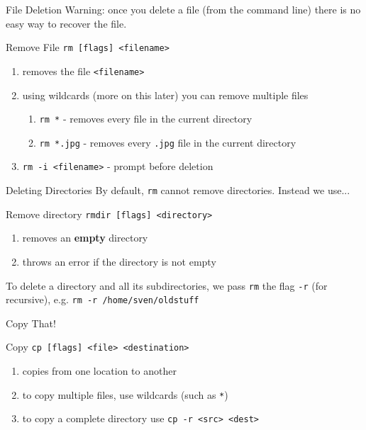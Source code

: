 \documentclass[11pt]{beamer}
\newcommand{\colbf}[1]{\textcolor{mLightBrown!77!black}{#1}}%
\begin{document}
\begin{frame}[fragile]{File Deletion}
  Warning: once you delete a file (from the command line) there is no easy way to recover the file.

  \begin{block}{\colbf{R}e\colbf{m}ove File}
    \texttt{rm [flags] <filename>}
    \begin{enumerate}[\--]
      \item removes the file \texttt{<filename>}
      \item using wildcards (more on this later) you can remove multiple files
      \begin{enumerate}[\--]
        \item \texttt{rm *} \-- removes every file in the current directory
        \item \texttt{rm *.jpg} \-- removes every \texttt{.jpg} file in the current directory
      \end{enumerate}
      \item \texttt{rm -i <filename>} \-- prompt before deletion
    \end{enumerate}
    \vspace*{1em}
  \end{block}
\end{frame}

\begin{frame}[fragile]{Deleting Directories}
  By default, \texttt{rm} cannot remove directories. Instead we use...

  \begin{block}{\colbf{R}e\colbf{m}ove \colbf{dir}ectory}
    \texttt{rmdir [flags] <directory>}
    \begin{enumerate}[\--]
      \item removes an \textbf{empty} directory
      \item throws an error if the directory is not empty
    \end{enumerate}
    \vspace*{1em}
  \end{block}

  To delete a directory and all its subdirectories, we pass \texttt{rm} the flag \texttt{-r} (for recursive),
  e.g. \texttt{rm -r /home/sven/oldstuff}
\end{frame}

\begin{frame}[fragile]{Copy That!}
  \begin{block}{\colbf{C}o\colbf{p}y}
    \texttt{cp [flags] <file> <destination>}
    \begin{enumerate}[\--]
      \item copies from one location to another
      \item to copy multiple files, use wildcards (such as \texttt{*})
      \item to copy a complete directory use \texttt{cp -r <src> <dest>}
    \end{enumerate}
    \vspace*{1em}
  \end{block}
\end{frame}
\end{document}
